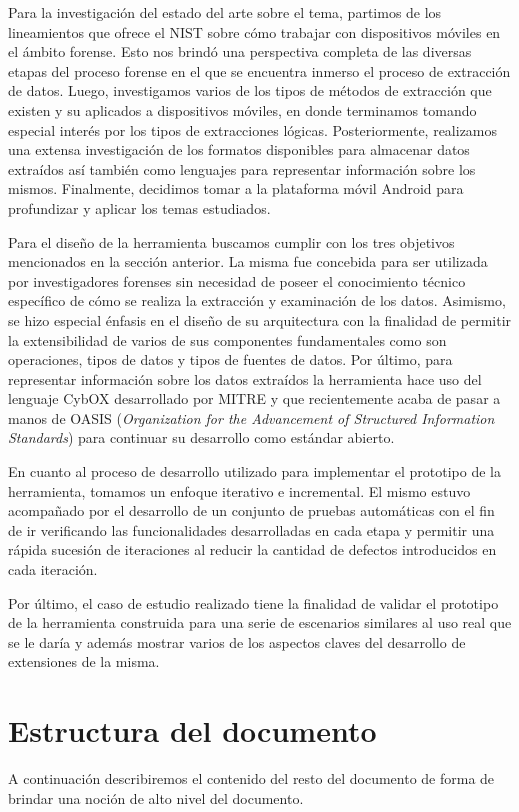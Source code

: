 Para la investigación del estado del arte sobre el tema, partimos de los lineamientos que ofrece el NIST sobre cómo trabajar con dispositivos móviles en el ámbito forense. Esto nos brindó una perspectiva completa de las diversas etapas del proceso forense en el que se encuentra inmerso el proceso de extracción de datos. Luego, investigamos varios de los tipos de métodos de extracción que existen y su aplicados a dispositivos móviles, en donde terminamos tomando especial interés por los tipos de extracciones lógicas. Posteriormente, realizamos una extensa investigación de los formatos disponibles para almacenar datos extraídos así también como lenguajes para representar información sobre los mismos. Finalmente, decidimos tomar a la plataforma móvil Android para profundizar y aplicar los temas estudiados.

Para el diseño de la herramienta buscamos cumplir con los tres objetivos mencionados en la sección anterior. La misma fue concebida para ser utilizada por investigadores forenses sin necesidad de poseer el conocimiento técnico específico de cómo se realiza la extracción y examinación de los datos. Asimismo, se hizo especial énfasis en el diseño de su arquitectura con la finalidad de permitir la extensibilidad de varios de sus componentes fundamentales como son operaciones, tipos de datos y tipos de fuentes de datos. Por último, para representar información sobre los datos extraídos la herramienta hace uso del lenguaje CybOX desarrollado por MITRE y que recientemente acaba de pasar a manos de OASIS (\emph{Organization for the Advancement of Structured Information Standards}) para continuar su desarrollo como estándar abierto.

En cuanto al proceso de desarrollo utilizado para implementar el prototipo de la herramienta, tomamos un enfoque iterativo e incremental. El mismo estuvo acompañado por el desarrollo de un conjunto de pruebas automáticas con el fin de ir verificando las funcionalidades desarrolladas en cada etapa y permitir una rápida sucesión de iteraciones al reducir la cantidad de defectos introducidos en cada iteración.

Por último, el caso de estudio realizado tiene la finalidad de validar el prototipo de la herramienta construida para una serie de escenarios similares al uso real que se le daría y además mostrar varios de los aspectos claves del desarrollo de extensiones de la misma.

\section{Estructura del documento}
A continuación describiremos el contenido del resto del documento de forma de brindar una noción de alto nivel del documento.

